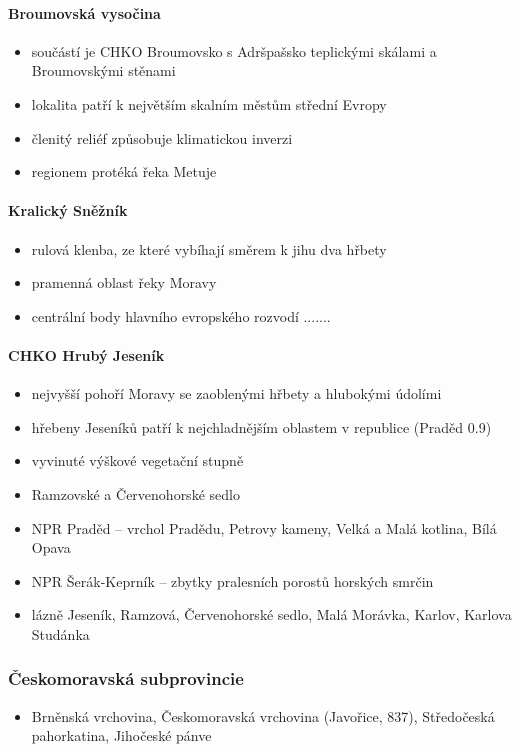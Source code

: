 \paragraph{Broumovská vysočina}
\begin{itemize}
\item součástí je CHKO Broumovsko s Adršpašsko teplickými skálami a Broumovskými stěnami
\item lokalita patří k největším skalním městům střední Evropy
\item členitý reliéf způsobuje klimatickou inverzi
\item regionem protéká řeka Metuje
\end{itemize}

\paragraph{Kralický Sněžník}
\begin{itemize}
\item rulová klenba, ze které vybíhají směrem k jihu dva hřbety
\item pramenná oblast řeky Moravy
\item centrální body hlavního evropského rozvodí  .......
\end{itemize}

\paragraph{CHKO Hrubý Jeseník}
\begin{itemize}
\item nejvyšší pohoří Moravy se zaoblenými hřbety a hlubokými údolími
\item hřebeny Jeseníků patří k nejchladnějším oblastem v republice (Praděd 0.9)
\item vyvinuté výškové vegetační stupně
\item Ramzovské a Červenohorské sedlo
\item NPR Praděd -- vrchol Pradědu, Petrovy kameny, Velká a Malá kotlina, Bílá Opava
\item NPR Šerák-Keprník -- zbytky pralesních porostů horských smrčin
\item lázně Jeseník, Ramzová, Červenohorské sedlo, Malá Morávka, Karlov, Karlova Studánka
\end{itemize}

\subsubsection{Českomoravská subprovincie}
\begin{itemize}
\item Brněnská vrchovina, Českomoravská vrchovina (Javořice, 837), Středočeská pahorkatina, Jihočeské pánve
\end{itemize}

